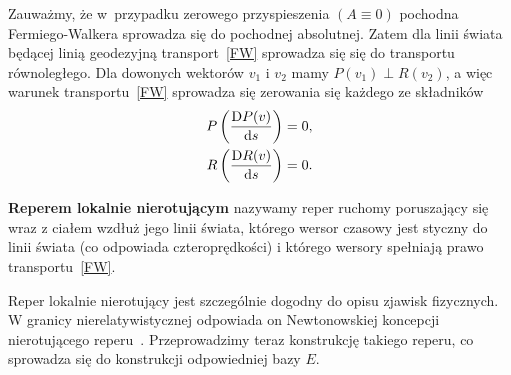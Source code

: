 Zauważmy, że w~przypadku zerowego przyspieszenia $(A\equiv 0)$
pochodna Fermiego-Walkera sprowadza się do pochodnej absolutnej.
Zatem dla linii świata będącej linią geodezyjną 
transport~\eqref{FW} sprowadza się się do 
transportu równoległego.
Dla dowonych wektorów $v_1$ i $v_2$ mamy $P(v_1)\perp R(v_2)$,
a więc warunek transportu~\eqref{FW} 
sprowadza się zerowania się każdego ze składników
\begin{align*}
P \left(\frac{\text{D} P(v)}{\text{d} s} \right)  = 0 ,\\
R \left( \frac{\text{D} R(v)}{\text{d} s} \right) = 0.
\end{align*}




\begin{definition}
\textbf{Reperem lokalnie nierotującym} nazywamy reper ruchomy poruszający
się wraz z ciałem wzdłuż jego linii świata, którego 
wersor czasowy jest styczny do linii świata (co odpowiada czteroprędkości)
i którego wersory spełniają prawo transportu~\eqref{FW}.
\end{definition}
Reper lokalnie nierotujący jest szczególnie dogodny do opisu zjawisk 
fizycznych. W granicy nierelatywistycznej odpowiada on Newtonowskiej 
koncepcji nierotującego reperu~\cite{synge1960}. Przeprowadzimy teraz
konstrukcję takiego reperu, co sprowadza się do konstrukcji 
odpowiedniej bazy $E$.

